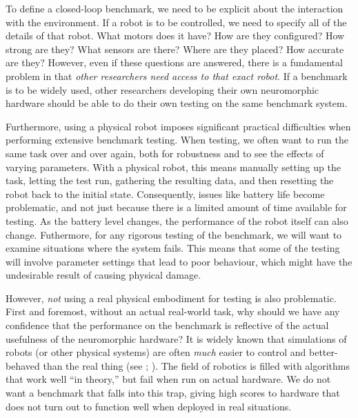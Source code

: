 \documentclass{frontiersSCNS} %
\begin{document}
To define a closed-loop benchmark, we need to be explicit about the interaction with the environment.  If
a robot is to be controlled, we need to specify all of the details of that robot.  What motors does it have?  How are they
configured?  How strong are they?  What sensors are there?  Where are they
placed?  How accurate are they?  However, even if these questions are
answered, there is a fundamental problem in that \emph{other researchers
need access to that exact robot}.  If a benchmark is to be widely used, other
researchers developing their own neuromorphic hardware should be able to do their own 
testing on the same benchmark system.

Furthermore, using a physical robot imposes significant practical
difficulties when performing extensive benchmark testing.  When testing, we
often want to run the same task over and over again, both for robustness and
to see the effects of varying parameters.  With a physical robot, this means
manually setting up the task, letting the test run, gathering the resulting
data, and then resetting the robot back to the initial state.  Consequently,
issues like battery life become problematic, and not just because there is a
limited amount of time available for testing.  As the battery level changes,
the performance of the robot itself can also change.  Futhermore, for any
rigorous testing of the benchmark, we will want to examine situations where
the system fails.  This means that some of the testing will involve parameter
settings that lead to poor behaviour, which might have the undesirable 
result of causing physical damage.

However, \emph{not} using a real physical embodiment for testing is also
problematic.  First and foremost, without an actual real-world task, why
should we have any confidence that the performance on the benchmark is
reflective of the actual usefulness of the neuromorphic hardware?  It is
widely known that simulations of robots (or other physical systems) are
often \emph{much} easier to control and better-behaved than the real thing 
(see \citealt{Jakobi95}; \citealt{Koos2013}).  The
field of robotics is filled with algorithms that work well ``in theory,'' but
fail when run on actual hardware.  We do not want a benchmark that falls into
this trap, giving high scores to hardware that does not turn out to
function well when deployed in real situations.
\end{document}
